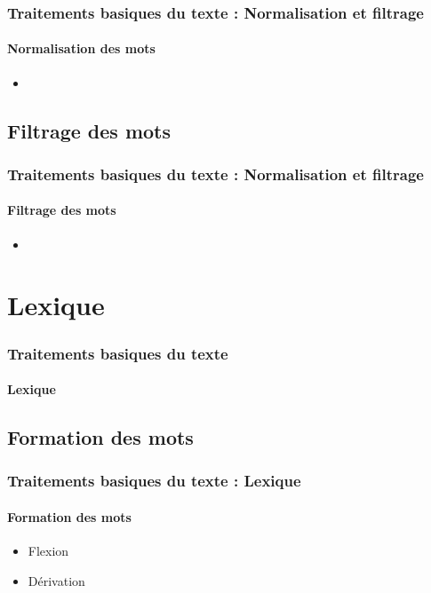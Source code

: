 \documentclass[xcolor=table]{beamer}
\begin{document}
\begin{frame}
\frametitle{Traitements basiques du texte : Normalisation et filtrage}
\framesubtitle{Normalisation des mots}

\begin{itemize}
\item 
\end{itemize}

\end{frame}

\subsection{Filtrage des mots}

\begin{frame}
\frametitle{Traitements basiques du texte : Normalisation et filtrage}
\framesubtitle{Filtrage des mots}

\begin{itemize}
\item 
\end{itemize}

\end{frame}

\section{Lexique}

\begin{frame}
\frametitle{Traitements basiques du texte}
\framesubtitle{Lexique}


\end{frame}

\subsection{Formation des mots}

\begin{frame}
\frametitle{Traitements basiques du texte : Lexique}
\framesubtitle{Formation des mots}

\begin{itemize}
\item Flexion
\item Dérivation
\end{itemize}

\end{frame}
\end{document}

